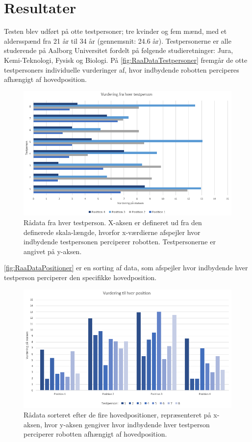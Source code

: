 \section{Resultater}
\label{SkaleringseksperimentResultater}
%
Testen blev udført på otte testpersoner; tre kvinder og fem mænd, med et aldersspænd fra 21 år til 34 år (gennemsnit: 24.6 år). Testpersonerne er alle studerende på Aalborg Universitet fordelt på følgende studieretninger: Jura, Kemi-Teknologi, Fysisk og Biologi.\blankline
%
På \autoref{fig:RaaDataTestpersoner} fremgår de otte testpersoners individuelle vurderinger af, hvor indbydende robotten perciperes afhængigt af hovedposition.  
%
\begin{figure}[H]
\centering
\includegraphics[width = \textwidth]{Figure/RaaDataTestpersoner.PNG} 
\caption{Rådata fra hver testperson. X-aksen er defineret ud fra den definerede skala-længde, hvorfor x-værdierne afspejler hvor indbydende testpersonen perciperer robotten. Testpersonerne er angivet på y-aksen.}
\label{fig:RaaDataTestpersoner}
\end{figure}
\noindent
%
\autoref{fig:RaaDataPositioner} er en sorting af data, som afspejler hvor indbydende hver testperson perciperer den specifikke hovedposition. 
%
\begin{figure}[H]
\centering
\includegraphics[width = \textwidth]{Figure/RaaDataPositioner.PNG} 
\caption{Rådata sorteret efter de fire hovedpositioner, repræsenteret på x-aksen, hvor y-aksen gengiver hvor indbydende hver testperson perciperer robotten afhængigt af hovedposition.}
\label{fig:RaaDataPositioner}
\end{figure}
